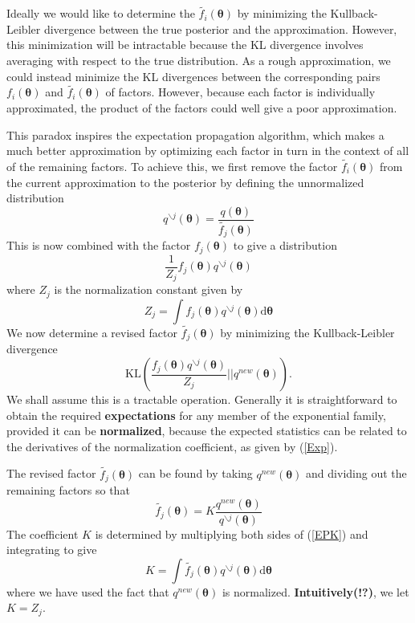 \documentclass[a4paper]{report}
\newcommand{\ud}{\mathrm{d}}
\newcommand{\up}{\mathrm}
\renewcommand{\bf}{\mathbf}
\newcommand{\bs}{\boldsymbol}
\begin{document}
Ideally we would like to determine the $\tilde{f_i}(\bs{\theta})$ by minimizing the Kullback-Leibler divergence between the true posterior and the approximation. However, this minimization will be intractable because the KL divergence involves averaging with respect to the true distribution. As a rough approximation, we could instead minimize the KL divergences between the corresponding pairs $f_i(\bs{\theta})$ and $\tilde{f_i}(\bs{\theta})$ of factors. However, because each factor is individually approximated, the product of the factors could well give a poor approximation.

This paradox inspires the expectation propagation algorithm, which makes a much better approximation by optimizing each factor in turn in the context of all of the remaining factors. To achieve this, we first remove the factor $\tilde{f_i}(\bs{\theta})$ from the current approximation to the posterior by defining the unnormalized distribution
\begin{equation}
	q^{\backslash j}(\bs{\theta}) = \frac{q(\bs{\theta})}{\tilde{f_j}(\bs{\theta})}
\end{equation}
This is now combined with the factor $f_j(\bs{\theta})$ to give a distribution
\begin{equation}
	\frac{1}{Z_j} f_j(\bs{\theta})q^{\backslash j}(\bs{\theta})
\end{equation}
where $Z_j$ is the normalization constant given by
\begin{equation}
	Z_j = \int f_j(\bs{\theta}) q^{\backslash j}(\bs{\theta}) \ud \bs{\theta}
\end{equation}
We now determine a revised factor $\tilde{f_j}(\bs{\theta})$ by minimizing the Kullback-Leibler divergence
\begin{equation}
	\up{KL}\left( \frac{f_j(\bs{\theta})q^{\backslash j}(\bs{\theta})}{Z_j} \bigg| \bigg| q^{new}(\bs{\theta}) \right).
\end{equation}
We shall assume this is a tractable operation. Generally it is straightforward to obtain the required \textbf{expectations} for any member of the exponential family, provided it can be \textbf{normalized}, because the expected statistics can be related to the derivatives of the normalization coefficient, as given by (\ref{Exp}).

The revised factor $\tilde{f_j}(\bs{\theta})$ can be found by taking $q^{new}(\bf{\theta})$ and dividing out the remaining factors so that
\begin{equation}
	\tilde{f_j}(\bs{\theta}) = K \frac{q^{new}(\bs{\theta})}{q^{\backslash j}(\bs{\theta})} \label{EPK}
\end{equation}
The coefficient $K$ is determined by multiplying both sides of (\ref{EPK}) and integrating to give
\begin{equation}
	K = \int \tilde{f_j}(\bs{\theta}) q^{\backslash j}(\bs{\theta}) \ud \bs{\theta}
\end{equation}
where we have used the fact that $q^{new}(\bs{\theta})$ is normalized. \textbf{Intuitively(!?)}, we let $K = Z_j$.
\end{document}
